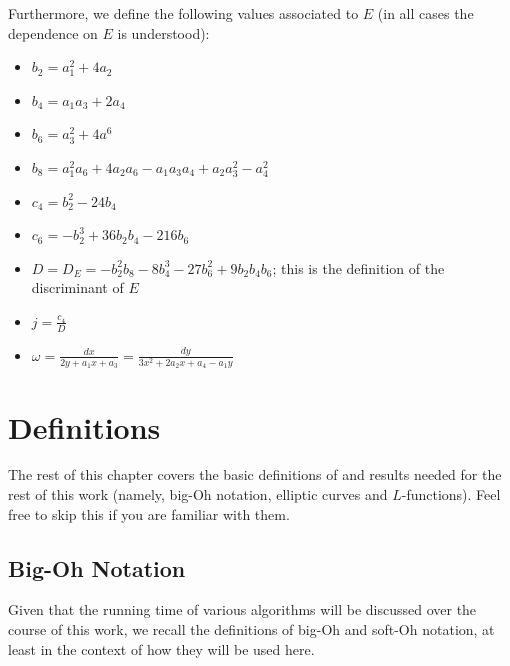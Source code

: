 Furthermore, we define the following values associated to $E$ (in all cases the dependence on $E$ is understood):
\begin{itemize}
\item $b_2 = a_1^2 + 4a_2$
\item $b_4 = a_1 a_3 + 2a_4$
\item $b_6 = a_3^2 + 4a^6$
\item $b_8 = a_1^2 a_6 + 4 a_2 a_6 - a_1 a_3 a_4 + a_2 a_3^2 - a_4^2$
\item $c_4 = b_2^2 - 24 b_4$
\item $c_6 = -b_2^3 + 36 b_2 b_4  - 216 b_6$
\item $D = D_E = -b_2^2 b_8 - 8 b_4^3 - 27 b_6^2 + 9 b_2 b_4 b_6$; this is the definition of the discriminant of $E$
\item $j = \frac{c_4}{D}$
\item $\omega = \frac{dx}{2y + a_1 x + a_3} = \frac{dy}{3x^2 + 2a_2 x + a_4 - a_1 y}$
\end{itemize}

\newpage
\section{Definitions}

The rest of this chapter covers the basic definitions of and results needed for the rest of this work (namely, big-Oh notation, elliptic curves and $L$-functions). Feel free to skip this if you are familiar with them.

\subsection{Big-Oh Notation}

Given that the running time of various algorithms will be discussed over the course of this work, we recall the definitions of big-Oh and soft-Oh notation, at least in the context of how they will be used here.

